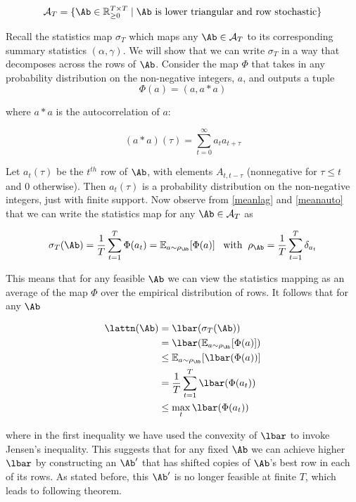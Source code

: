\documentclass{article}
\begin{document}
\begin{equation}
    \mathcal{A}_T = \{\Ab \in \mathbb{R}^{T \times T}_{\ge0} \mid \Ab \text{ is lower triangular and row stochastic} \}
\end{equation}

Recall the statistics map $\sigma_T$ which maps any $\Ab \in \mathcal{A}_T$ to its corresponding summary statistics $(\alpha, \gamma)$. We will show that we can write $\sigma_T$ in a way that decomposes across the rows of $\Ab$. Consider the map $\Phi$ that takes in any probability distribution on the non-negative integers, $a$, and outputs a tuple
\begin{equation}
    \Phi(a) = (a, a\ast a)
\end{equation}

where $a \ast a$ is the autocorrelation of $a$:

\begin{equation}
    (a \ast a)(\tau) = \sum_{t=0}^\infty a_t a_{t+\tau} 
\end{equation}

Let $a_t(\tau)$ be the $t^{th}$ row of $\Ab$, with elements $A_{t, t-\tau}$ (nonnegative for $\tau \le t$ and $0$ otherwise). Then $a_t(\tau)$ is a probability distribution on the non-negative integers, just with finite support. Now observe from \eqref{meanlag} and \eqref{meanauto} that we can write the statistics map for any $\Ab\in \mathcal{A}_T$ as

\begin{equation}
    \sigma_T(\Ab) = \frac{1}{T}\sum_{t=1}^T\Phi(a_t) = \mathbb{E}_{a \sim \rho_{\Ab}}[\Phi(a)]\;\;\;\text{with} \; \; \rho_{\Ab} = \frac{1}{T}\sum_{t=1}^T\delta_{a_t} 
\end{equation}

This means that for any feasible $\Ab$ we can view the statistics mapping as an average of the map $\Phi$ over the empirical distribution of rows. It follows that for any $\Ab$

\begin{align}
    \lattn(\Ab) &= \lbar(\sigma_T(\Ab)) \\
    &= \lbar(\mathbb{E}_{a \sim \rho_{\Ab}}[\Phi(a)])\\
    &\le \mathbb{E}_{a \sim \rho_{\Ab}}[\lbar(\Phi(a))]\\
    &= \frac{1}{T} \sum_{t=1}^T\lbar(\Phi(a_t))\\
    &\le \max_t \lbar(\Phi(a_t))
\end{align}

where in the first inequality we have used the convexity of $\lbar$ to invoke Jensen's inequality. This suggests that for any fixed $\Ab$ we can achieve higher $\lbar$ by constructing an $\Ab'$ that has shifted copies of $\Ab$'s best row in each of its rows. As stated before, this $\Ab'$ is no longer feasible at finite $T$, which leads to following theorem. 
\end{document}

